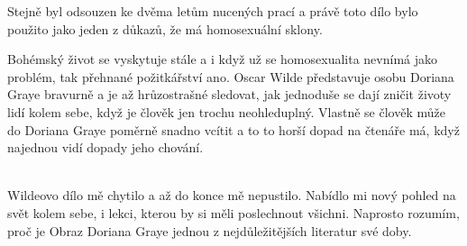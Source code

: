 \documentclass[FGBook.tex]{subfiles}
\begin{document}
\noindent
Stejně byl odsouzen ke dvěma letům nucených prací a právě toto dílo bylo použito jako jeden z důkazů, že má homosexuální sklony.

\noindent
Bohémský život se vyskytuje stále a i když už se homosexualita nevnímá jako problém, tak přehnané požitkářství ano.
Oscar Wilde představuje osobu Doriana Graye bravurně a je až hrůzostrašné sledovat, jak jednoduše se dají zničit životy lidí kolem sebe, když je člověk jen trochu neohleduplný.
Vlastně se člověk může do Doriana Graye poměrně snadno vcítit a to to horší dopad na čtenáře má, když najednou vidí dopady jeho chování.

\vspace*{2em}\\
\noindent 
Wildeovo dílo mě chytilo a až do konce mě nepustilo.
Nabídlo mi nový pohled na svět kolem sebe, i lekci, kterou by si měli poslechnout všichni.
Naprosto rozumím, proč je Obraz Doriana Graye jednou z nejdůležitějších literatur své doby.

\newpage
\end{document}
